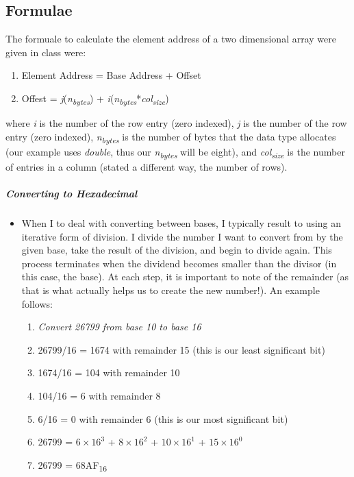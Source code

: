 \documentclass[12pt]{article}
\begin{document}
\subsection{Formulae}
The formuale to calculate the element address of a two dimensional array were given in class were:
\begin{enumerate}
\item Element Address = Base Address + Offset
\item Offest = \textit{j}(\textit{n\textsubscript{bytes}}) + \textit{i}(\textit{n\textsubscript{bytes}}*\textit{col\textsubscript{size}})
\end{enumerate}
where \textit{i} is the number of the row entry (zero indexed), \textit{j} is the number of the row entry (zero indexed), \textit{n\textsubscript{bytes}} is the number of bytes that the data type allocates (our example uses \textit{double}, thus our \textit{n\textsubscript{bytes}} will be eight), and \textit{col\textsubscript{size}} is the number of entries in a column (stated a different way, the number of rows).
\subparagraph{Converting to Hexadecimal}
\begin{itemize}[leftmargin=1.5em]
\item[] When I to deal with converting between bases, I typically result to using an iterative form of division. I divide the number I want to convert from by the given base, take the result of the division, and begin to divide again. This process terminates when the dividend becomes smaller than the divisor (in this case, the base). At each step, it is important to note of the remainder (as that is what actually helps us to create the new number!). An example follows:
\begin{enumerate}
\item[] \textit{Convert 26799 from base 10 to base 16}
\item 26799/16 = 1674 with remainder 15 (this is our least significant bit)
\item 1674/16 = 104 with remainder 10
\item 104/16 = 6 with remainder 8
\item 6/16 = 0 with remainder 6 (this is our most significant bit)
\item 26799 = $6\times16^3$ + $8\times16^2$ + $10\times16^1$ + $15\times16^0$
\item 26799 = 68AF\textsubscript{16}
\end{enumerate}
\end{itemize}
\end{document}
